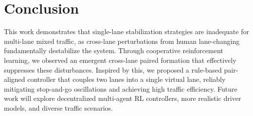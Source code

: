 \documentclass{ifacconf}
\begin{document}
\section{Conclusion}
\label{sec:Conclusion}
This work demonstrates that single-lane stabilization strategies are inadequate for multi-lane mixed traffic, as cross-lane perturbations from human lane-changing fundamentally destabilize the system. Through cooperative reinforcement learning, we observed an emergent cross-lane paired formation that effectively suppresses these disturbances. Inspired by this, we proposed a rule-based pair-aligned controller that couples two lanes into a single virtual lane, reliably mitigating stop-and-go oscillations and achieving high traffic efficiency. Future work will explore decentralized multi-agent RL controllers, more realistic driver models, and diverse traffic scenarios.

\balance
\scriptsize


  
\end{document}
